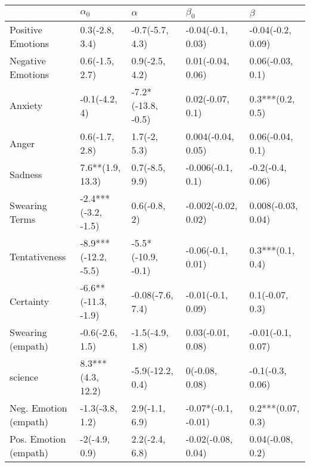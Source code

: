 \begin{tabular}{lllll}
\toprule
{} &            $\alpha_0$ &            $\alpha$ &            $\beta_0$ &             $\beta$ \\
\midrule
Positive Emotions     &        0.3(-2.8, 3.4) &     -0.7(-5.7, 4.3) &    -0.04(-0.1, 0.03) &   -0.04(-0.2, 0.09) \\
Negative Emotions     &        0.6(-1.5, 2.7) &      0.9(-2.5, 4.2) &    0.01(-0.04, 0.06) &    0.06(-0.03, 0.1) \\
Anxiety               &         -0.1(-4.2, 4) &  -7.2*(-13.8, -0.5) &     0.02(-0.07, 0.1) &    0.3***(0.2, 0.5) \\
Anger                 &        0.6(-1.7, 2.8) &        1.7(-2, 5.3) &   0.004(-0.04, 0.05) &    0.06(-0.04, 0.1) \\
Sadness               &      7.6**(1.9, 13.3) &      0.7(-8.5, 9.9) &    -0.006(-0.1, 0.1) &    -0.2(-0.4, 0.06) \\
Swearing Terms        &   -2.4***(-3.2, -1.5) &        0.6(-0.8, 2) &  -0.002(-0.02, 0.02) &  0.008(-0.03, 0.04) \\
Tentativeness         &  -8.9***(-12.2, -5.5) &  -5.5*(-10.9, -0.1) &    -0.06(-0.1, 0.01) &    0.3***(0.1, 0.4) \\
Certainty             &   -6.6**(-11.3, -1.9) &    -0.08(-7.6, 7.4) &    -0.01(-0.1, 0.09) &     0.1(-0.07, 0.3) \\
Swearing (empath)     &       -0.6(-2.6, 1.5) &     -1.5(-4.9, 1.8) &    0.03(-0.01, 0.08) &   -0.01(-0.1, 0.07) \\
science               &     8.3***(4.3, 12.2) &    -5.9(-12.2, 0.4) &       0(-0.08, 0.08) &    -0.1(-0.3, 0.06) \\
Neg. Emotion (empath) &       -1.3(-3.8, 1.2) &      2.9(-1.1, 6.9) &  -0.07*(-0.1, -0.01) &   0.2***(0.07, 0.3) \\
Pos. Emotion (empath) &         -2(-4.9, 0.9) &      2.2(-2.4, 6.8) &   -0.02(-0.08, 0.04) &    0.04(-0.08, 0.2) \\
\bottomrule
\end{tabular}
